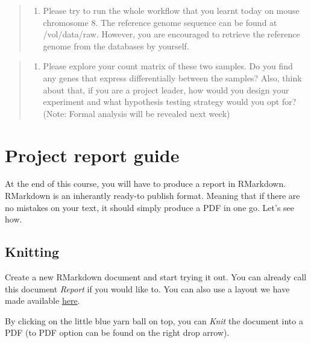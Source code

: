 \documentclass[
]{book}
\providecommand{\tightlist}{%
  \setlength{\itemsep}{0pt}\setlength{\parskip}{0pt}}
\begin{document}
\begin{quote}
\begin{enumerate}
\def\labelenumi{\arabic{enumi}.}
\setcounter{enumi}{1}
\tightlist
\item
  Please try to run the whole workflow that you learnt today on mouse chromosome 8. The reference genome sequence can be found at /vol/data/raw. However, you are encouraged to retrieve the reference genome from the databases by yourself.
\end{enumerate}
\end{quote}

\begin{quote}
\begin{enumerate}
\def\labelenumi{\arabic{enumi}.}
\setcounter{enumi}{2}
\tightlist
\item
  Please explore your count matrix of these two samples. Do you find any genes that express differentially between the samples? Also, think about that, if you are a project leader, how would you design your experiment and what hypothesis testing strategy would you opt for? (Note: Formal analysis will be revealed next week)
\end{enumerate}
\end{quote}

\hypertarget{project-report-guide}{%
\chapter*{Project report guide}\label{project-report-guide}}

At the end of this course, you will have to produce a report in RMarkdown. RMarkdown is an inherantly ready-to publish format. Meaning that if there are no mistakes on your text, it should simply produce a PDF in one go. Let's see how.

\hypertarget{knitting}{%
\section{Knitting}\label{knitting}}

Create a new RMarkdown document and start trying it out. You can already call this document \emph{Report} if you would like to. You can also use a layout we have made available \href{https://github.com/hdsu-bioquant/bioinfo_MoBiMA/tree/main/report_example}{here}.

By clicking on the little blue yarn ball on top, you can \emph{Knit} the document into a PDF (to PDF option can be found on the right drop arrow).
\end{document}
